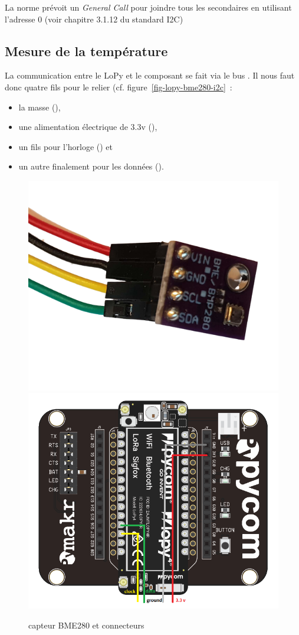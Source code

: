 {La norme prévoit un \textit{General Call} pour joindre tous les secondaires en utilisant l'adresse 0 (voir chapitre 3.1.12 du standard I2C)}


\subsection {Mesure de la température}

La communication entre le LoPy et le composant se fait via le bus . Il nous faut donc quatre fils pour le relier (cf. figure~\vref{fig-lopy-bme280-i2c}~: 
\begin{itemize}
    \item la masse (\texttt{}), 
    \item une alimentation électrique de 3.3v (\texttt{}), 
    \item un fils pour l'horloge (\texttt{}) et 
    \item un autre finalement pour les données (\texttt{}).
\end{itemize} 

\begin{figure}[tbp]
\centerline{\includegraphics[width=.5\columnwidth]{Pictures/BME280-i2c.png}  \includegraphics[width=.5\columnwidth]{Pictures/LoPy4.png}  }
\caption{capteur BME280 et connecteurs}
\label{fig-lopy-bme280-i2c}
\end{figure}

